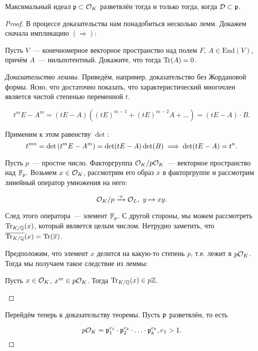 	 \begin{theorem} 
	 	Максимальный идеал $\mathfrak{p} \subset \mathcal{O}_{K}$ разветвлён тогда и только тогда, когда $\mathcal{D} \subset \mathfrak{p}$.
	 \end{theorem}
	 \begin{proof} В процессе доказательства нам понадобиться несколько лемм.  Докажем сначала импликацию $(\mathbf{\Rightarrow})$:

	 	\begin{lemma}
	 		Пусть $V$~--- конечномерное векторное пространство над полем $F$, $A \in \mathrm{End}(V)$, причём $A$~--- нильпотентный. Докажите, что тогда $\operatorname{Tr}(A) = 0$.
	 	\end{lemma}
	 	\begin{proof}[Доказательство леммы]
	 	Приведём, например, доказательство без Жордановой формы. Ясно, что достаточно показать, что характеристический многочлен является чистой степенью переменной $t$.

	 	\[
	 		t^m E - A^m = (tE - A)((tE)^{m - 1} + (tE)^{m - 2} A + \ldots) = (tE - A) \cdot B.
	 	\]

	 	Применим к этом равенству $\det$:
	 	\[ 
	 		t^{mn} = \det{\lr*{t^m E - A^m}} = \det\lr*{tE - A}\det\lr*{B} \implies \det\lr*{tE - A} = t^n. 
		\]

		Пусть $p$~--- простое число. Факторгруппа $\mathcal{O}_{K}/p\mathcal{O}_{K}$~--- векторное пространство над $\mathbb{F}_{p}$. Возьмем $x \in \mathcal{O}_{K}$, рассмотрим его образ $\overline{x}$ в факторгруппе и рассмотрим линейный оператор умножения на него:

		\[
			\mathcal{O}_{K}/p \xrightarrow{\cdot x} \mathcal{O}_{L}, \ y \mapsto xy. 
		\]

		След этого оператора~--- элемент $\mathbb{F}_{p}$. С другой стороны, мы можем рассмотреть $\operatorname{Tr}_{K/\mathbb{Q}}(x)$, который является целым числом.  Нетрудно заметить, что $\overline{\operatorname{Tr}_{K/\mathbb{Q}}}(x) = \operatorname{Tr}(\overline{x})$. 

		Предположим, что элемент $x$ делится на какую-то степень $p$, т.е. лежит в $p\mathcal{O}_{K}$. Тогда мы получаем такое следствие из леммы:

		\begin{corollary}\label{TraceCor}
			Пусть $x \in \mathcal{O}_{K}$, $x^m \in p\mathcal{O}_{K}$. Тогда $\operatorname{Tr}_{K/\mathbb{Q}}(x) \in p\mathbb{Z}$. 
		\end{corollary}	
	 	\end{proof}

	 	Перейдём теперь к доказательству теоремы. Пусть $\mathfrak{p}$ разветвлён,  то есть 

	 	\[
	 		p\mathcal{O}_{K} = \mathfrak{p}_1^{e_1} \cdot \mathfrak{p}_{2}^{e_2} \cdot \ldots \cdot \mathfrak{p}_{k}^{e_k}, e_1 > 1.
	 	\]


\end{proof}
